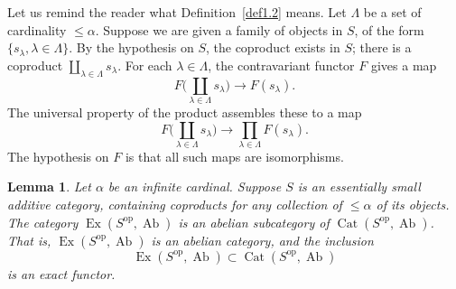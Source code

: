 \documentclass[11pt,a4paper]{article}
\theoremstyle{plain}
\newtheorem{lemma}[theorem]{Lemma}
\theoremstyle{definition}
\DeclareMathOperator{\Cat}{Cat}
\DeclareMathOperator{\Ex}{Ex}
\DeclareMathOperator{\Ab}{Ab}
\newcommand{\op}{\mathrm{op}}
\numberwithin{equation}{section}
\begin{document}
Let us remind the reader what Definition~\ref{def1.2} means. Let $\Lambda$ be a set of cardinality $\leq\alpha$. Suppose we are given a family of objects in $S$, of the form $\{s_{\lambda}, \lambda \in \Lambda\}$. By the hypothesis on $S$, the coproduct exists in $S$; there is a coproduct $\coprod_{\lambda\in\Lambda} s_{\lambda}$. For each $\lambda \in \Lambda$, the contravariant functor $F$ gives a map
\begin{equation*}
F\Big(\coprod_{\lambda\in\Lambda} s_{\lambda}\Big) \longrightarrow F(s_{\lambda}).
\end{equation*}
The universal property of the product assembles these to a map
\begin{equation*}
F\Big(\coprod_{\lambda\in\Lambda} s_{\lambda}\Big) \longrightarrow \prod_{\lambda\in\Lambda} F(s_{\lambda}).
\end{equation*}
The hypothesis on $F$ is that all such maps are isomorphisms.

\begin{lemma}\label{lem1.3}
Let $\alpha$ be an infinite cardinal. Suppose $S$ is an essentially small additive category, containing coproducts for any collection of $\leq\alpha$ of its objects. The category $\Ex(S^{\op},\Ab)$ is an abelian subcategory of $\Cat(S^{\op},\Ab)$. That is, $\Ex(S^{\op},\Ab)$ is an abelian category, and the inclusion
\begin{equation*}
\Ex(S^{\op},\Ab) \subset \Cat(S^{\op},\Ab)
\end{equation*}
is an exact functor.
\end{lemma}
\end{document}

